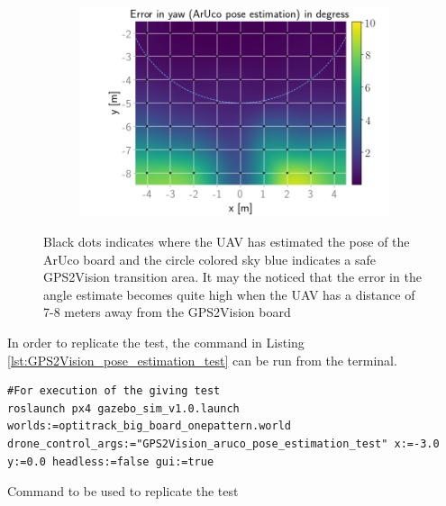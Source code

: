 \documentclass[../Head/report.tex]{subfiles}
\begin{document}
\begin{figure}[H]
    \hspace{-0.9em}
    \begin{subfigure}[t]{.337\textwidth}
        \centering
        \includegraphics[width=\textwidth]{../Figures/GPS2Vision_pose_estimation_test/test1_aruco_board_width_0.2_space_0.1/aruco_pose_estimation_error_yaw.png}
        \caption{}
        \label{fig:GPS2Vision_pose_estimation_test1_error_yaw}
    \end{subfigure}
    \caption{Black dots indicates where the UAV has estimated the pose of the ArUco board and the circle colored sky blue indicates a safe GPS2Vision transition area. It may the noticed that the error in the angle estimate becomes quite high when the UAV has a distance of 7-8 meters away from the GPS2Vision board}
    \label{fig:GPS2Vision_pose_estimation_test1_error_ori}
\end{figure}

In order to replicate the test, the command in Listing \ref{lst:GPS2Vision_pose_estimation_test} can be run from the terminal.

\begin{listing}[H] 
\begin{tcolorbox}[
    enhanced,
    attach boxed title to top left={xshift=6mm,yshift=-3mm},
    colback=lightgreen!20,
    colframe=lightgreen,
    fonttitle=\bfseries\color{black},
]
\begin{verbatim}
#For execution of the giving test
roslaunch px4 gazebo_sim_v1.0.launch worlds:=optitrack_big_board_onepattern.world drone_control_args:="GPS2Vision_aruco_pose_estimation_test" x:=-3.0 y:=0.0 headless:=false gui:=true
\end{verbatim}
\end{tcolorbox}
\caption{Command to be used to replicate the test}
\label{lst:GPS2Vision_pose_estimation_test}    
\end{listing} 
\end{document}
